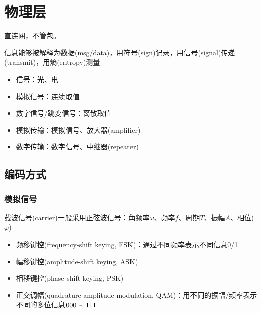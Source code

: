 
\section{物理层}
直连网，不管包。

信息能够被解释为数据(msg/data)，用符号(sign)记录，用信号(signal)传递(transmit)，用熵(entropy)测量
\begin{itemize}
	\item 信号：光、电
	\item 模拟信号：连续取值
	\item 数字信号/跳变信号：离散取值
	\item 模拟传输：模拟信号、放大器(amplifier)
	\item 数字传输：数字信号、中继器(repeater)
\end{itemize}

\subsection{编码方式}
\subsubsection{模拟信号}
载波信号(carrier)一般采用正弦波信号：角频率$\omega$、频率$f$、周期$T$、振幅$A$、相位($\varphi$)
\begin{itemize}
	\item 频移键控(frequency-shift keying, FSK)：通过不同频率表示不同信息0/1
	\item 幅移键控(amplitude-shift keying, ASK)
	\item 相移键控(phase-shift keying, PSK)
	\item 正交调幅(quadrature amplitude modulation, QAM)：用不同的振幅/频率表示不同的多位信息$000\thicksim 111$
\end{itemize}

